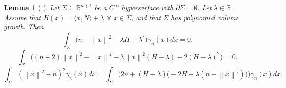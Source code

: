 \documentclass[12pt,reqno]{amsart}
\newtheorem{lemma}[theorem]{Lemma}
\theoremstyle{definition}
\renewcommand{\subset}{\subseteq}
\newcommand{\vnormt}[1]{\left\|#1\right\|}    %
\newcommand{\R}{\mathbb{R}}
\newcommand{\snote}[1]{\textcolor{red}{\small {\textbf{(}#1\textbf{) }}}}
\newcommand{\sdimn}{n}
\newcommand{\adimn}{n+1}
\newcommand{\scon}{\lambda}
\begin{document}
\begin{lemma}[{\cite[Lemma 3.25]{colding12a} \cite[Lemma 3.3]{cheng15}}]
Let $\Sigma\subset\R^{\adimn}$ be a $C^{\infty}$ hypersurface with $\partial\Sigma=\emptyset$.  Let $\scon\in\R$.  Assume that $H(x)=\langle x,N\rangle+\scon$ $\forall$ $x\in\Sigma$, and that $\Sigma$ has polynomial volume growth.  Then
\begin{equation}\label{three15}
\int_{\Sigma}\Big(\sdimn-\vnormt{x}^{2} -\scon H+\scon^{2}\Big)\gamma_{\sdimn}(x)dx=0.
\end{equation}
\begin{equation}\label{three18}
\int_{\Sigma}\Big((\sdimn+2)\vnormt{x}^{2}-\vnormt{x}^{4}-\scon\vnormt{x}^{2}(H-\scon)-2(H-\scon)^{2}\Big)=0.
\end{equation}
\begin{equation}\label{three19}
\int_{\Sigma}(\vnormt{x}^{2}-\sdimn)^{2}\gamma_{\sdimn}(x)dx=
\int_{\Sigma}\Big(2n+(H-\scon)\Big(-2H+\scon(\sdimn -\vnormt{x}^{2})\Big)\Big)\gamma_{\sdimn}(x)dx.
\end{equation}
\end{lemma}
\end{document}
